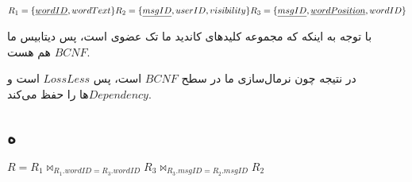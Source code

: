 \setLTR
$
R_1 = \{\underline{wordID} , wordText\} \\
R_2 = \{\underline{msgID},userID,visibility\} \\
R_3 = \{\underline{msgID},\underline{wordPosition},wordID\}
$
\setRTL

با توجه به اینکه که مجموعه کلیدهای کاندید ما تک عضوی است، پس دیتابیس ما 
$BCNF$
هم هست.

در نتیجه چون نرمال‌سازی ما در سطح $BCNF$ است، پس $LossLess$ است و $Dependency$ها را حفظ می‌کند.
\subsection*{ه}

\setLTR
$
R = R_1 \bowtie_{R_1.wordID=R_3.wordID} R_3 \bowtie_{R_3.msgID=R_2.msgID} R_2
$
\setRTL
